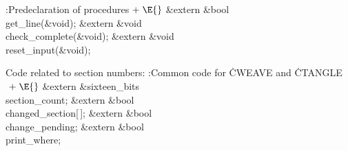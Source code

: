 \B{}:Predeclaration of procedures\X${}\mathrel+\E{}$\6
\&{extern} \&{bool} \\{get\_line}(\&{void});\6
\&{extern} \&{void} \\{check\_complete}(\&{void});\6
\&{extern} \&{void} \\{reset\_input}(\&{void});\par
\fi

Code related to section numbers:
\Y\B\4:Common code for \.{CWEAVE} and \.{CTANGLE}\X${}\mathrel+\E{}$\6
\&{extern} \&{sixteen\_bits} \\{section\_count};\6
\&{extern} \&{bool} \\{changed\_section}[\,];\6
\&{extern} \&{bool} \\{change\_pending};\6
\&{extern} \&{bool} \\{print\_where};\par
\fi

